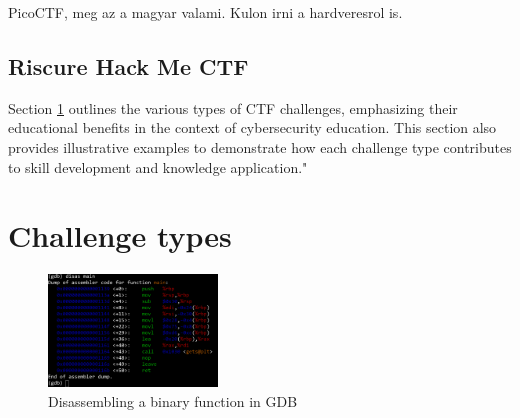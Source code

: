 \documentclass[conference]{IEEEtran}
\begin{document}
PicoCTF, meg az a magyar valami. Kulon irni a hardveresrol is.

\subsection{Riscure Hack Me CTF}

\cite{prinetto2020}



Section \ref{sec-challenge-types} outlines the various types of CTF challenges,
emphasizing their educational benefits in the context of cybersecurity
education. This section also provides illustrative examples to demonstrate how
each challenge type contributes to skill development and knowledge
application."

\cite{gyorok2014}
\cite{safar2019}
\cite{beszedes2023}

\cite{rahman2020}

\cite{schneider2013}

\cite{lhee2003}

\cite{morkel2005}

\cite{luciano1987}

\cite{ndatinya2015}

\cite{stallman1988}

\cite{eagle2020}

\cite{butun2019}

\cite{ziade2004}

\section{Challenge types}
\label{sec-challenge-types}

\begin{figure}[htbp]
	\centering
	\includegraphics[width=0.4\textwidth]{fig/gdb.png}
	\caption{Disassembling a binary function in GDB}
	\label{fig-gdb}
\end{figure}
\end{document}
